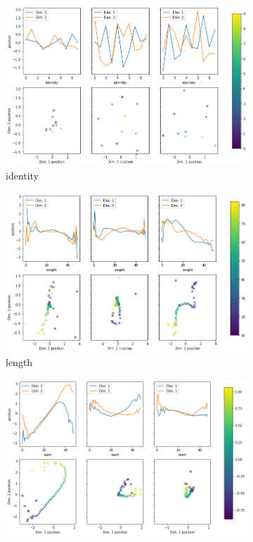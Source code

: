 \begin{figure}
\begin{subfigure}{.48\textwidth}
        \includegraphics[width=\textwidth]{images/latent_space_traversals/vlae_mnist_morpho_latent_space_values_identity.png}
        \caption{identity}
        \label{subfig:vlae_mnist_morpho_latent_space_values_identity}
    \end{subfigure}
    \hfill
    \begin{subfigure}{.48\textwidth}
        \includegraphics[width=\textwidth]{images/latent_space_traversals/vlae_mnist_morpho_latent_space_values_length.png}
        \caption{length}
    \end{subfigure}
    \begin{subfigure}{.48\textwidth}
        \includegraphics[width=\textwidth]{images/latent_space_traversals/vlae_mnist_morpho_latent_space_values_slant.png}

\end{subfigure}
\end{figure}
